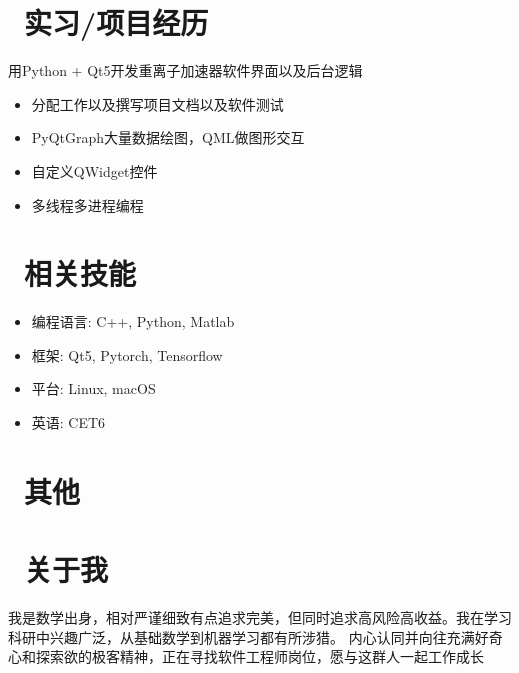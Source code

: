 \documentclass{resume}
\begin{document}
\section{\faUsers\ 实习/项目经历}
\begin{onehalfspacing}
用Python + Qt5开发重离子加速器软件界面以及后台逻辑
\begin{itemize}
  \item 分配工作以及撰写项目文档以及软件测试
  \item PyQtGraph大量数据绘图，QML做图形交互
  \item 自定义QWidget控件
  \item 多线程多进程编程
\end{itemize}
\end{onehalfspacing}


\section{\faCogs\ 相关技能}
\vspace{-1\baselineskip}
\begin{multicols}{2}
\begin{itemize}[parsep=0.5ex]
    \item 编程语言: C++, Python, Matlab
    \item 框架: Qt5, Pytorch, Tensorflow
    \item 平台: Linux, macOS
    \item 英语: CET6
\end{itemize}
\end{multicols}

\section{\faInfo\ 其他}

\section{\faGamepad\ 关于我}
我是数学出身，相对严谨细致有点追求完美，但同时追求高风险高收益。我在学习科研中兴趣广泛，从基础数学到机器学习都有所涉猎。
内心认同并向往充满好奇心和探索欲的极客精神，正在寻找软件工程师岗位，愿与这群人一起工作成长

%
%
\end{document}

